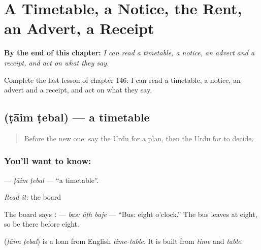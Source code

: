 
\chapter{A Timetable, a Notice, the Rent, an Advert, a Receipt}
\label{ch:ur-a-timetable-a-notice-the-rent-an-advert-a-receipt}

\begin{chapteropening}
\textbf{By the end of this chapter:} \emph{I can read a timetable, a notice, an advert and a receipt, and act on what they say.}

Complete the last lesson of chapter 146: I can read a timetable, a notice, an advert and a receipt, and act on what they say.
\end{chapteropening}

\section[\texorpdfstring{\ur{ٹائم} \ur{ٹیبل} (ṭāim ṭebal)}{ٹائم ٹیبل (ṭāim ṭebal)}]{  (ṭāim ṭebal) — a timetable}

\label{lesson:UR-C146-taim-tebal}



\begin{quote}
Before the new one: say the Urdu for a plan, then the Urdu for to decide.
\end{quote}

\subsection*{You'll want to know:  }
\textbf{ } — \emph{ṭāim ṭebal} — \textquotedblleft{}a timetable\textquotedblright{}.

\emph{Read it:} the board

The board says \textbf{:  } — \emph{bas: āṭh baje} — \textquotedblleft{}Bus: eight o'clock.\textquotedblright{} The bus leaves at eight, so be there before eight.

\begin{cousinweb}
\textbf{ } (\emph{ṭāim ṭebal}) is a loan from English \emph{time-table}. It is built from \emph{time} and \emph{table}.
\end{cousinweb}

